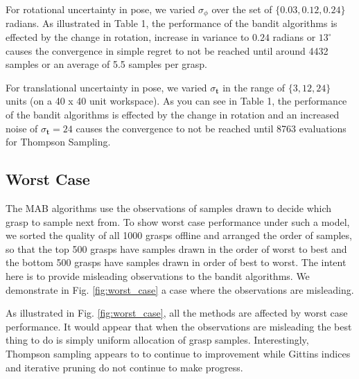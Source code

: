 \documentclass[10pt, conference]{ieeeconf}      %
\newcommand{\bt}{\mathbf{t}}
\begin{document}
For rotational uncertainty in pose, we varied $\sigma_{\phi}$ over the set of $\lbrace 0.03, 0.12,0.24\rbrace$ radians. As illustrated in Table 1, the performance of the bandit algorithms is effected by the change in rotation, increase in variance to $0.24$ radians or $13^{\circ}$  causes the convergence in simple regret to not be reached until around 4432 samples or an average of 5.5 samples per grasp. 

For translational uncertainty in pose, we varied $\sigma_{\bt}$ in the range of $\lbrace 3,12, 24 \rbrace$ units (on a 40 x 40 unit workspace). As you can see in Table 1, the performance of the bandit algorithms is effected by the change in rotation and an increased noise of $\sigma_{\bt} = 24$ causes the convergence to not be reached until 8763 evaluations for Thompson Sampling. 



\subsection{Worst Case}
The MAB algorithms use the observations of samples drawn to decide which grasp to sample next from. To show worst case performance under such a model, we sorted the quality of all 1000 grasps offline and arranged the order of samples, so that the top 500 grasps have samples drawn in the order of worst to best and the bottom 500 grasps have samples drawn in order of best to worst. The intent here is to provide misleading observations to the bandit algorithms. We demonstrate in Fig. \ref{fig:worst_case} a case where the observations are misleading. 

As illustrated in Fig. \ref{fig:worst_case}, all the methods are affected by worst case performance. It would appear that when the observations are misleading the best thing to do is simply uniform allocation of grasp samples. Interestingly, Thompson sampling appears to to continue to improvement while Gittins indices and iterative pruning do not continue to make progress.
\end{document}

